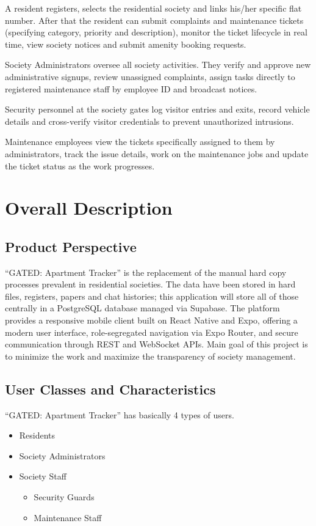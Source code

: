 \documentclass[a4paper,10pt]{scrartcl}
\numberwithin{figure}{section}
\begin{document}
A resident registers, selects the residential society and links his/her specific flat number. After that the resident can submit complaints and maintenance tickets (specifying category, priority and description), monitor the ticket lifecycle in real time, view society notices and submit amenity booking requests.

Society Administrators oversee all society activities. They verify and approve new administrative signups, review unassigned complaints, assign tasks directly to registered maintenance staff by employee ID and broadcast notices.

Security personnel at the society gates log visitor entries and exits, record vehicle details and cross-verify visitor credentials to prevent unauthorized intrusions.

Maintenance employees view the tickets specifically assigned to them by administrators, track the issue details, work on the maintenance jobs and update the ticket status as the work progresses.


\newpage
\section{Overall Description}
\subsection{Product Perspective}
``GATED: Apartment Tracker'' is the replacement of the manual hard copy processes prevalent in residential societies. The data have been stored in hard files, registers, papers and chat histories; this application will store all of those centrally in a PostgreSQL database managed via Supabase. The platform provides a responsive mobile client built on React Native and Expo, offering a modern user interface, role-segregated navigation via Expo Router, and secure communication through REST and WebSocket APIs. Main goal of this project is to minimize the work and maximize the transparency of society management.

\subsection{User Classes and Characteristics}
``GATED: Apartment Tracker'' has basically 4 types of users.
\begin{itemize}
\item Residents
\item Society Administrators
\item Society Staff
  \begin{itemize}
  \item[--] Security Guards
  \item[--] Maintenance Staff
  \end{itemize}
\end{itemize}
\end{document}
